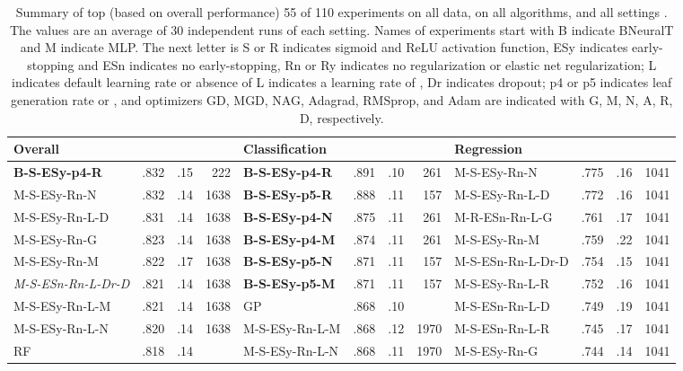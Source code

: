 \documentclass[11pt,a4paper]{article}
\begin{document}
    
\begin{table}[]
    \tiny
    \centering 
    \renewcommand{\arraystretch}{1.2}
    \setlength{\tabcolsep}{5pt}
    \caption{Summary of top (based on overall performance) 55 of 110 experiments on all data, on all algorithms, and all settings . The values are an average of 30 independent runs of each setting. Names of experiments start with B indicate BNeuralT and M indicate MLP. The next letter is S or R indicates sigmoid and ReLU activation function, ESy indicates early-stopping and ESn indicates no early-stopping, Rn or Ry indicates no regularization or elastic net regularization; L indicates default learning rate or absence of L indicates a learning rate of , Dr indicates dropout; p4 or p5 indicates leaf generation rate  or , and optimizers GD, MGD, NAG, Adagrad, RMSprop, and Adam are  indicated with G, M, N, A, R, D, respectively.
\label{tab:All_experiments_A}}
    \begin{tabular}[t]{lrrrlrrrlrrr}
        \toprule
        Overall &  &  &  & Classification &  &  &  & Regression &  &  &  \\
        \midrule
        \textbf{B-S-ESy-p4-R} & .832 & .15 & 222 & \textbf{B-S-ESy-p4-R} & .891 & .10 & 261 & M-S-ESy-Rn-N & .775 & .16 & 1041  \\
        M-S-ESy-Rn-N & .832 & .14 & 1638 & \textbf{B-S-ESy-p5-R} & .888 & .11 & 157 & M-S-ESy-Rn-L-D & .772 & .16 & 1041  \\
        M-S-ESy-Rn-L-D & .831 & .14 & 1638 & \textbf{B-S-ESy-p4-N} & .875 & .11 & 261 & M-R-ESn-Rn-L-G & .761 & .17 & 1041  \\
        M-S-ESy-Rn-G & .823 & .14 & 1638 & \textbf{B-S-ESy-p4-M} & .874 & .11 & 261 & M-S-ESy-Rn-M & .759 & .22 & 1041  \\
        M-S-ESy-Rn-M & .822 & .17 & 1638 & \textbf{B-S-ESy-p5-N} & .871 & .11 & 157 & M-S-ESn-Rn-L-Dr-D & .754 & .15 & 1041  \\
        \textit{M-S-ESn-Rn-L-Dr-D} & .821 & .14 & 1638 & \textbf{B-S-ESy-p5-M} & .871 & .11 & 157 & M-S-ESy-Rn-L-R & .752 & .16 & 1041  \\
        M-S-ESy-Rn-L-M & .821 & .14 & 1638 & GP & .868 & .10 &  & M-S-ESn-Rn-L-D & .749 & .19 & 1041  \\
        M-S-ESy-Rn-L-N & .820 & .14 & 1638 & M-S-ESy-Rn-L-M & .868 & .12 & 1970 & M-S-ESn-Rn-L-R & .745 & .17 & 1041  \\
        RF & .818 & .14 &  & M-S-ESy-Rn-L-N & .868 & .11 & 1970 & M-S-ESy-Rn-G & .744 & .14 & 1041  \\

\end{tabular}
\end{table}
\end{document}
